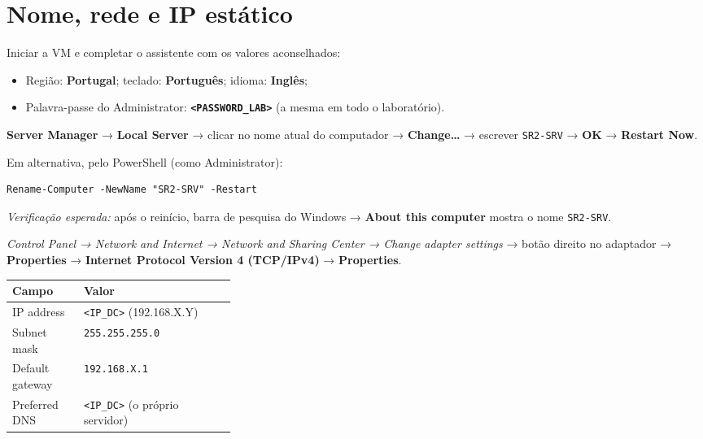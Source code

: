 
\section[Nome, rede e IP estático]{Nome, rede e IP estático}


Iniciar a VM e completar o assistente com os valores aconselhados:

\begin{itemize}
\item Região: \textbf{Portugal}; teclado: \textbf{Português}; idioma: \textbf{Inglês};
\item Palavra-passe do Administrator: \textbf{\texttt{\textless{}PASSWORD\_LAB\textgreater{}}} (a mesma em todo o laboratório).
\end{itemize}


\textbf{Server Manager} → \textbf{Local Server} → clicar no nome atual do computador → \textbf{Change\ldots} → escrever \texttt{SR2-SRV} → \textbf{OK} → \textbf{Restart Now}.

Em alternativa, pelo PowerShell (como Administrator):

\begin{lstlisting}[style=psstyle]
Rename-Computer -NewName "SR2-SRV" -Restart
\end{lstlisting}

\emph{Verificação esperada:} após o reinício, barra de pesquisa do Windows → \textbf{About this computer} mostra o nome \texttt{SR2-SRV}.


\emph{Control Panel → Network and Internet → Network and Sharing Center → Change adapter settings} → botão direito no adaptador → \textbf{Properties} → \textbf{Internet Protocol Version 4 (TCP/IPv4)} → \textbf{Properties}.


\begin{center}\small
\begin{tabularx}{\linewidth}{|>{\raggedright\arraybackslash}p{0.32\linewidth}|>{\raggedright\arraybackslash}X|}
\hline
\rowcolor{azul!10}\textbf{Campo} & \textbf{Valor} \\
\hline
IP address & \texttt{\textless{}IP\_DC\textgreater{}} (192.168.X.Y) \\
\hline
Subnet mask & \texttt{255.255.255.0} \\
\hline
Default gateway & \texttt{192.168.X.1} \\
\hline
Preferred DNS & \texttt{\textless{}IP\_DC\textgreater{}} (o próprio servidor) \\
\hline
\end{tabularx}
\end{center}

